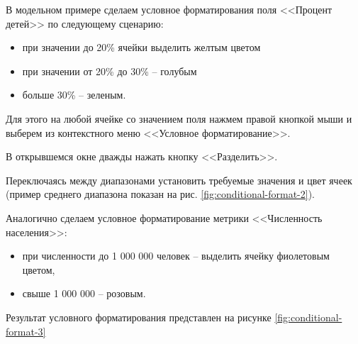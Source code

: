 \documentclass[../user-manual.tex]{subfiles}
\begin{document}
	\begin{modelExample}
		В модельном примере сделаем условное форматирования поля <<Процент детей>> по следующему сценарию:
		
		\begin{itemize}
			\item при значении до 20\% ячейки выделить желтым цветом
			\item при значении от 20\% до 30\% -- голубым
			\item больше 30\% -- зеленым.
		\end{itemize}
	
		Для этого на любой ячейке со значением поля нажмем правой кнопкой мыши и выберем из контекстного меню <<Условное форматирование>>.
		
		В открывшемся окне дважды нажать кнопку <<Разделить>>.
		
		Переключаясь между диапазонами установить требуемые значения и цвет ячеек (пример среднего диапазона показан на рис. \ref{fig:conditional-format-2}).
		
		Аналогично сделаем условное форматирование метрики <<Численность населения>>:
		
		\begin{itemize}
			\item при численности до 1 000 000 человек -- выделить ячейку фиолетовым цветом,
			\item свыше 1 000 000 -- розовым.
		\end{itemize}
		
		Результат условного форматирования представлен на рисунке \ref{fig:conditional-format-3}
	\end{modelExample}
\end{document}
